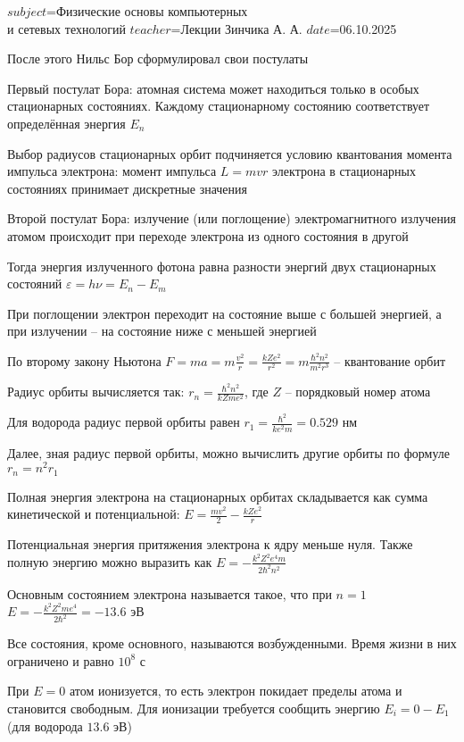$subject$=Физические основы компьютерных \\ и сетевых технологий
$teacher$=Лекции Зинчика А. А.
$date$=06.10.2025

После этого Нильс Бор сформулировал свои постулаты

Первый постулат Бора: атомная система может находиться только в особых стационарных состояниях. Каждому стационарному состоянию соответствует определённая энергия $E_n$

Выбор радиусов стационарных орбит подчиняется условию квантования момента импульса электрона: момент импульса $L = m v r$ электрона в стационарных состояниях принимает дискретные значения

Второй постулат Бора: излучение (или поглощение) электромагнитного излучения атомом происходит при переходе электрона из одного состояния в другой

Тогда энергия излученного фотона равна разности энергий двух стационарных состояний $\varepsilon = h \nu = E_n - E_m$

При поглощении электрон переходит на состояние выше с большей энергией, а при излучении -- на состояние ниже с меньшей энергией

По второму закону Ньютона $F = m a = m \frac{v^2}{r} = \frac{k Z e^2}{r^2} = m \frac{\hbar^2 n^2}{m^2 r^3}$ -- квантование орбит 

Радиус орбиты вычисляется так: $r_n = \frac{\hbar^2 n^2}{k Z m e^2}$, где $Z$ -- порядковый номер атома

Для водорода радиус первой орбиты равен $r_1 = \frac{\hbar^2}{k e^2 m} = 0.529$ нм

Далее, зная радиус первой орбиты, можно вычислить другие орбиты по формуле $r_n = n^2 r_1$


\smallvspace

Полная энергия электрона на стационарных орбитах складывается как сумма кинетической и потенциальной: $E = \frac{m v^2}{2} - \frac{k Z e^2}{r}$

Потенциальная энергия притяжения электрона к ядру меньше нуля. Также полную энергию можно выразить как $E = -\frac{k^2 Z^2 e^4 m}{2 \hbar^2 n^2}$

Основным состоянием электрона называется такое, что при $n = 1$ $E = -\frac{k^2 Z^2 m e^4}{2\hbar^2} = -13.6$ эВ 

Все состояния, кроме основного, называются возбужденными. Время жизни в них ограничено и равно $10^8$ с

При $E = 0$ атом ионизуется, то есть электрон покидает пределы атома и становится свободным. Для ионизации требуется сообщить энергию $E_i = 0 - E_1$ (для водорода $13.6$ эВ)

